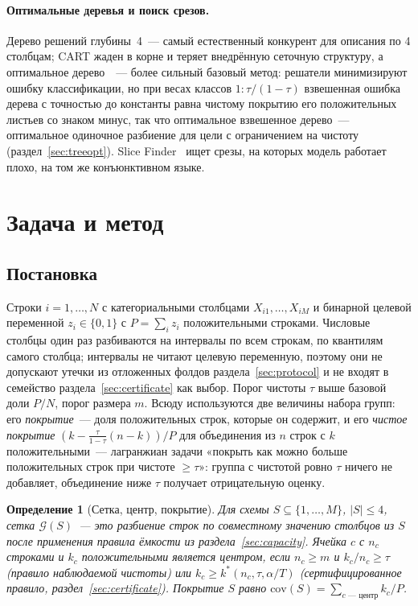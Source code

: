 \documentclass[11pt]{article}
\newtheorem{definition}{Определение}
\newcommand{\cov}{\mathrm{cov}}
\begin{document}
\paragraph{Оптимальные деревья и поиск срезов.} Дерево решений глубины~4~--- самый естественный конкурент для описания по 4 столбцам; CART жаден в корне и теряет внедрённую сеточную структуру, а оптимальное дерево~\citep{lin2020,demirovic2022,aglin2020}~--- более сильный базовый метод: решатели минимизируют ошибку классификации, но при весах классов $1:\tau/(1-\tau)$ взвешенная ошибка дерева с точностью до константы равна чистому покрытию его положительных листьев со знаком минус, так что оптимальное взвешенное дерево~--- оптимальное одиночное разбиение для цели с ограничением на чистоту (раздел~\ref{sec:treeopt}). Slice Finder~\citep{chung2019} ищет срезы, на которых модель работает плохо, на том же конъюнктивном языке.

\section{Задача и метод}\label{sec:method}

\subsection{Постановка}
Строки $i=1,\dots,N$ с категориальными столбцами $X_{i1},\dots,X_{iM}$ и бинарной целевой переменной $z_i\in\{0,1\}$ с $P=\sum_i z_i$ положительными строками. Числовые столбцы один раз разбиваются на интервалы по всем строкам, по квантилям самого столбца; интервалы не читают целевую переменную, поэтому они не допускают утечки из отложенных фолдов раздела~\ref{sec:protocol} и не входят в семейство раздела~\ref{sec:certificate} как выбор. Порог чистоты $\tau$ выше базовой доли $P/N$, порог размера $m$. Всюду используются две величины набора групп: его \emph{покрытие}~--- доля положительных строк, которые он содержит, и его \emph{чистое покрытие} $(k-\frac{\tau}{1-\tau}(n-k))/P$ для объединения из $n$ строк с $k$ положительными~--- лагранжиан задачи «покрыть как можно больше положительных строк при чистоте $\ge\tau$»: группа с чистотой ровно $\tau$ ничего не добавляет, объединение ниже $\tau$ получает отрицательную оценку.

\begin{definition}[Сетка, центр, покрытие]
Для схемы $S\subseteq\{1,\dots,M\}$, $|S|\le 4$, сетка $\mathcal{G}(S)$~--- это разбиение строк по совместному значению столбцов из $S$ после применения правила ёмкости из раздела~\ref{sec:capacity}. Ячейка $c$ с $n_c$ строками и $k_c$ положительными является центром, если $n_c\ge m$ и $k_c/n_c\ge\tau$ (правило наблюдаемой чистоты) или $k_c\ge k^*(n_c,\tau,\alpha/T)$ (сертифицированное правило, раздел~\ref{sec:certificate}). Покрытие $S$ равно $\cov(S)=\sum_{c\text{ — центр}} k_c / P$.
\end{definition}
\end{document}
